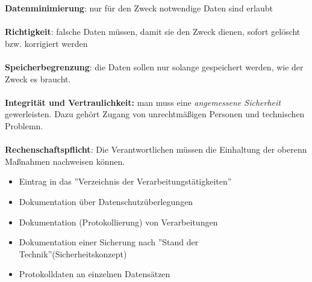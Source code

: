 \documentclass[12pt,a4paper]{article}
\begin{document}
    \textbf{Datenminimierung}:
        nur für den Zweck notwendige Daten sind erlaubt \\ \\
    \textbf{Richtigkeit}:
        falsche Daten müssen, damit sie den Zweck dienen, sofort gelöscht bzw. korrigiert werden \\ \\
    \textbf{Speicherbegrenzung}:
        die Daten sollen nur solange gespeichert werden, wie der Zweck es braucht. \\ \\
    \textbf{Integrität und Vertraulichkeit:}
        man muss eine \textit{angemessene Sicherheit} gewerleisten.
        Dazu gehört Zugang von unrechtmäßigen Personen und technischen Problemn.\\ \\
    \textbf{Rechenschaftspflicht}:
        Die Verantwortlichen müssen die Einhaltung der oberenn Maßnahmen nachweisen können.
        \begin{itemize}
            \item Eintrag in das ''Verzeichnis der Verarbeitungstätigkeiten''
            \item Dokumentation über Datenschutzüberlegungen
            \item Dokumentation (Protokollierung) von Verarbeitungen
            \item Dokumentation einer Sicherung nach ''Stand der Technik''(Sicherheitskonzept)
            \item Protokolldaten an einzelnen Datensätzen
        \end{itemize}
\end{document}
